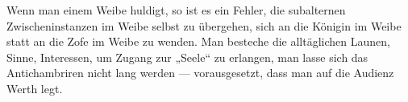 Wenn man einem Weibe huldigt, so ist es ein Fehler, die subalternen Zwischeninstanzen im Weibe selbst zu übergehen, sich an die Königin im Weibe statt an die Zofe im Weibe zu wenden. Man besteche die alltäglichen Launen, Sinne, Interessen, um Zugang zur „Seele“ zu erlangen, man lasse sich das Antichambriren nicht lang werden — vorausgesetzt, dass man auf die Audienz Werth legt.
\par

